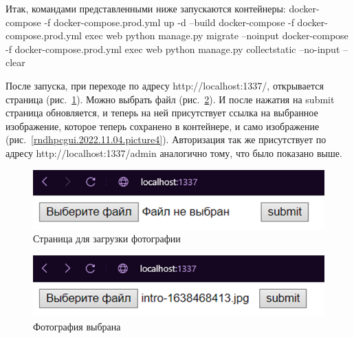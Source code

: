 Итак, командами представленными ниже запускаются контейнеры:
\textsf{docker-compose -f docker-compose.prod.yml up -d --build}
\textsf{docker-compose -f docker-compose.prod.yml exec web python manage.py migrate --noinput}
\textsf{docker-compose -f docker-compose.prod.yml exec web python manage.py collectstatic --no-input –clear}
	
После запуска, при переходе по адресу \textsf{http://localhost:1337/}, открывается страница (рис.~\ref{rndhpcgui.2022.11.04.picture2}). Можно выбрать файл (рис.~\ref{rndhpcgui.2022.11.04.picture3}). И после нажатия на \textsf{submit} страница обновляется, и теперь на ней присутствует ссылка на выбранное изображение, которое теперь сохранено в контейнере, и само изображение (рис.~\ref{rndhpcgui.2022.11.04.picture4}). Авторизация так же присутствует по адресу \textsf{http://localhost:1337/admin} аналогично тому, что было показано выше.

\begin{figure}[!ht]
  \centering
  \includegraphics[scale=0.8]{ResearchNotes/rndhpc_dev_gui_2022_11_04/rndhpcgui.2022.11.04.picture2.png}
  \caption{Страница для загрузки фотографии}
  \label{rndhpcgui.2022.11.04.picture2}
\end{figure}

\begin{figure}[!ht]
  \centering
  \includegraphics[scale=0.8]{ResearchNotes/rndhpc_dev_gui_2022_11_04/rndhpcgui.2022.11.04.picture3.png}
  \caption{Фотография выбрана}
  \label{rndhpcgui.2022.11.04.picture3}
\end{figure}

